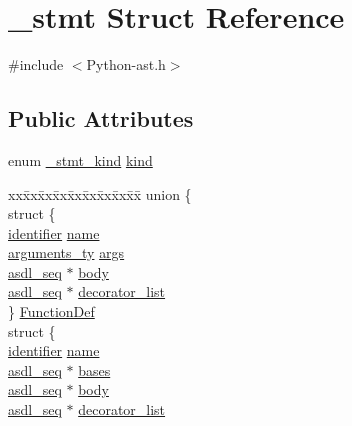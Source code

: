 \hypertarget{struct__stmt}{}\section{\+\_\+stmt Struct Reference}
\label{struct__stmt}


{\ttfamily \#include $<$Python-\/ast.\+h$>$}

\subsection*{Public Attributes}
\begin{DoxyCompactItemize}
\item 
enum \mbox{\hyperlink{_python-ast_8h_a3f8747ef1343a8899c10bb4911deed50}{\+\_\+stmt\+\_\+kind}} \mbox{\hyperlink{struct__stmt_a9074cf45fef325a5baa737d59102ec9a}{kind}}
\item 
\begin{tabbing}
xx\=xx\=xx\=xx\=xx\=xx\=xx\=xx\=xx\=\kill
union \{\\
\>struct \{\\
\>\>\mbox{\hyperlink{asdl_8h_a78ca2081e230a95abc88c411c9816775}{identifier}} \mbox{\hyperlink{struct__stmt_ab7db310d6742d73ac25decd9d8d97053}{name}}\\
\>\>\mbox{\hyperlink{_python-ast_8h_a45cc6e94d598fdc335d8c85739108a3e}{arguments\_ty}} \mbox{\hyperlink{struct__stmt_ac731167ba143dd9aa967900ec61abedf}{args}}\\
\>\>\mbox{\hyperlink{structasdl__seq}{asdl\_seq}} $\ast$ \mbox{\hyperlink{struct__stmt_a3af2e247c98c7a600aa988467119d0da}{body}}\\
\>\>\mbox{\hyperlink{structasdl__seq}{asdl\_seq}} $\ast$ \mbox{\hyperlink{struct__stmt_a739b41aa7343830a6bcfb7833155ba86}{decorator\_list}}\\
\>\} \mbox{\hyperlink{struct__stmt_a5e02cf8428c5b693aa36330b0ef070bb}{FunctionDef}}\\
\>struct \{\\
\>\>\mbox{\hyperlink{asdl_8h_a78ca2081e230a95abc88c411c9816775}{identifier}} \mbox{\hyperlink{struct__stmt_ab7db310d6742d73ac25decd9d8d97053}{name}}\\
\>\>\mbox{\hyperlink{structasdl__seq}{asdl\_seq}} $\ast$ \mbox{\hyperlink{struct__stmt_ade5a7beb8cbe67ccb6fd09c8e674c676}{bases}}\\
\>\>\mbox{\hyperlink{structasdl__seq}{asdl\_seq}} $\ast$ \mbox{\hyperlink{struct__stmt_a3af2e247c98c7a600aa988467119d0da}{body}}\\
\>\>\mbox{\hyperlink{structasdl__seq}{asdl\_seq}} $\ast$ \mbox{\hyperlink{struct__stmt_a739b41aa7343830a6bcfb7833155ba86}{decorator\_list}}\\

\end{tabbing}
\end{DoxyCompactItemize}
